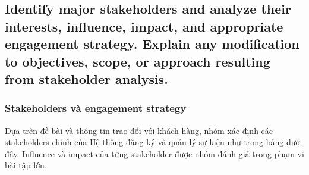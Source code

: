 \subsection{Identify major stakeholders and analyze their interests, influence, impact, and appropriate engagement strategy. Explain any modification to objectives, scope, or approach resulting from stakeholder analysis.}

\subsubsection{Stakeholders và engagement strategy}

Dựa trên đề bài và thông tin trao đổi với khách hàng, nhóm xác định các stakeholders chính của Hệ thống đăng ký và quản lý sự kiện như trong bảng dưới đây. Influence và impact của từng stakeholder được nhóm đánh giá trong phạm vi bài tập lớn.

